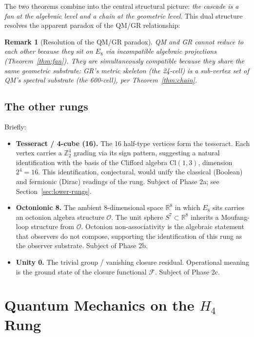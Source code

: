\documentclass[12pt]{article}
\newtheorem{remark}[theorem]{Remark}
\newcommand{\Fcal}{\mathcal{F}}
\begin{document}
The two theorems combine into the central structural picture: \emph{the cascade is a fan at the algebraic level and a chain at the geometric level}. This dual structure resolves the apparent paradox of the QM/GR relationship:

\begin{remark}[Resolution of the QM/GR paradox]\label{rmk:qmgr}
QM and GR cannot reduce to each other because they sit on $E_8$ via incompatible algebraic projections (Theorem~\ref{thm:fan}). They are simultaneously compatible because they share the same geometric substrate: GR's metric skeleton (the 24-cell) is a sub-vertex set of QM's spectral substrate (the 600-cell), per Theorem~\ref{thm:chain}.
\end{remark}

\subsection{The other rungs}\label{sec:emb:other}

Briefly:
\begin{itemize}
    \item \textbf{Tesseract / 4-cube (16).} The 16 half-type vertices form the tesseract. Each vertex carries a $\mathbb{Z}_2^4$ grading via its sign pattern, suggesting a natural identification with the basis of the Clifford algebra $\mathrm{Cl}(1,3)$, dimension $2^4 = 16$. This identification, conjectural, would unify the classical (Boolean) and fermionic (Dirac) readings of the rung. Subject of Phase 2a; see Section~\ref{sec:lower-rungs}.

    \item \textbf{Octonionic 8.} The ambient 8-dimensional space $\mathbb{R}^8$ in which $E_8$ sits carries an octonion algebra structure $\mathcal{O}$. The unit sphere $S^7 \subset \mathbb{R}^8$ inherits a Moufang-loop structure from $\mathcal{O}$. Octonion non-associativity is the algebraic statement that observers do not compose, supporting the identification of this rung as the observer substrate. Subject of Phase 2b.

    \item \textbf{Unity 0.} The trivial group / vanishing closure residual. Operational meaning is the ground state of the closure functional $\Fcal$. Subject of Phase 2c.
\end{itemize}

\section{Quantum Mechanics on the $H_4$ Rung}\label{sec:qm}
\end{document}
